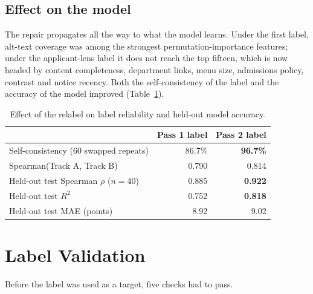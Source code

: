 \documentclass[11pt,a4paper]{article}
\begin{document}
\subsection{Effect on the model}

The repair propagates all the way to what the model learns. Under the first label, alt-text
coverage was among the strongest permutation-importance features; under the applicant-lens
label it does not reach the top fifteen, which is now headed by content completeness,
department links, menu size, admissions policy, contrast and notice recency. Both the
self-consistency of the label and the accuracy of the model improved (Table~\ref{tab:v1v2}).

\begin{table}[H]\centering\small
\caption{Effect of the relabel on label reliability and held-out model accuracy.}
\label{tab:v1v2}
\begin{tabular}{lrr}
\toprule
& \textbf{Pass 1 label} & \textbf{Pass 2 label} \\
\midrule
Self-consistency (60 swapped repeats) & 86.7\% & \textbf{96.7\%} \\
Spearman(Track A, Track B)            & 0.790  & 0.814 \\
Held-out test Spearman $\rho$ ($n=40$) & 0.885 & \textbf{0.922} \\
Held-out test $R^2$                   & 0.752  & \textbf{0.818} \\
Held-out test MAE (points)            & 8.92   & 9.02 \\
\bottomrule
\end{tabular}
\end{table}

\section{Label Validation}

Before the label was used as a target, five checks had to pass.
\end{document}

